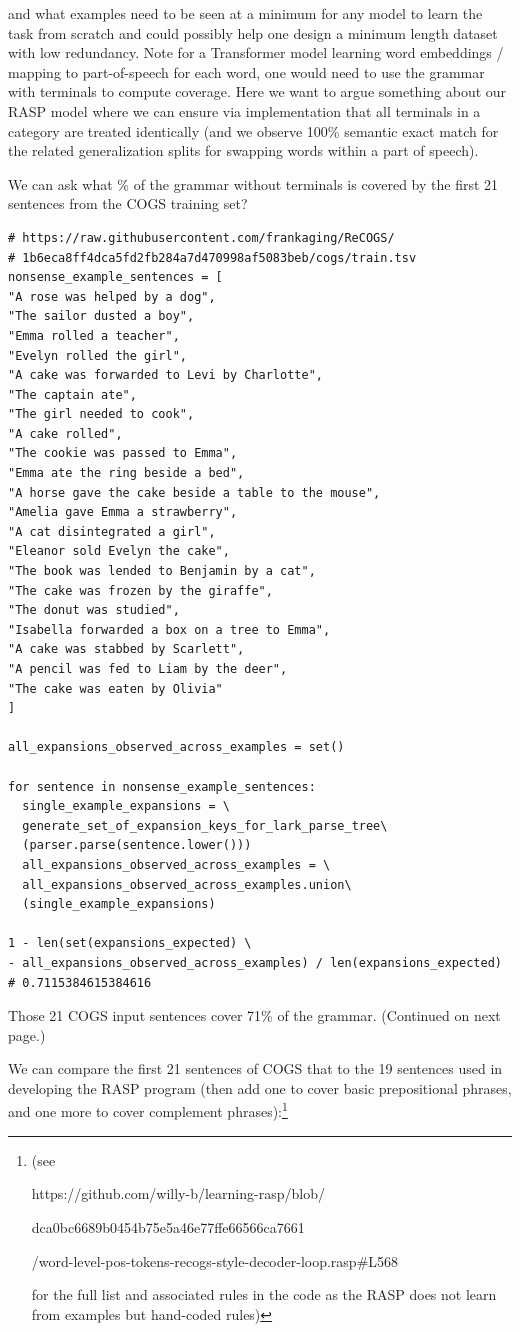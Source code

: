 \documentclass[11pt]{article}
\begin{document}
and what examples need to be seen at a minimum for any model to learn the task from scratch and could possibly help one design a minimum length dataset with low redundancy.
Note for a Transformer model learning word embeddings / mapping to part-of-speech for each word, one would need to use the grammar with terminals to compute coverage. Here we want to argue something about our RASP model where we can ensure via implementation that all terminals in a category are treated identically (and we observe 100\% semantic exact match for the related generalization splits for swapping words within a part of speech).


We can ask what \% of the grammar without terminals is covered by the first 21 sentences from the COGS training set?
\begin{tiny}
\begin{verbatim}
# https://raw.githubusercontent.com/frankaging/ReCOGS/
# 1b6eca8ff4dca5fd2fb284a7d470998af5083beb/cogs/train.tsv
nonsense_example_sentences = [
"A rose was helped by a dog",
"The sailor dusted a boy",
"Emma rolled a teacher",
"Evelyn rolled the girl",
"A cake was forwarded to Levi by Charlotte",
"The captain ate",
"The girl needed to cook",
"A cake rolled",
"The cookie was passed to Emma",
"Emma ate the ring beside a bed",
"A horse gave the cake beside a table to the mouse",
"Amelia gave Emma a strawberry",
"A cat disintegrated a girl",
"Eleanor sold Evelyn the cake",
"The book was lended to Benjamin by a cat",
"The cake was frozen by the giraffe",
"The donut was studied",
"Isabella forwarded a box on a tree to Emma",
"A cake was stabbed by Scarlett",
"A pencil was fed to Liam by the deer",
"The cake was eaten by Olivia"
]

all_expansions_observed_across_examples = set()

for sentence in nonsense_example_sentences:
  single_example_expansions = \
  generate_set_of_expansion_keys_for_lark_parse_tree\
  (parser.parse(sentence.lower()))
  all_expansions_observed_across_examples = \
  all_expansions_observed_across_examples.union\
  (single_example_expansions)

1 - len(set(expansions_expected) \
- all_expansions_observed_across_examples) / len(expansions_expected)
# 0.7115384615384616
\end{verbatim}
\end{tiny}
Those 21 COGS input sentences cover 71\% of the grammar. (Continued on next page.)

We can compare the first 21 sentences of COGS that to the 19 sentences used in developing the RASP program (then add one to cover basic prepositional phrases, and one more to cover complement phrases):\footnote{(see 

https://github.com/willy-b/learning-rasp/blob/

dca0bc6689b0454b75e5a46e77ffe66566ca7661

/word-level-pos-tokens-recogs-style-decoder-loop.rasp\#L568 

for the full list and associated rules in the code as the RASP does not learn from examples but hand-coded rules)}
\end{document}
